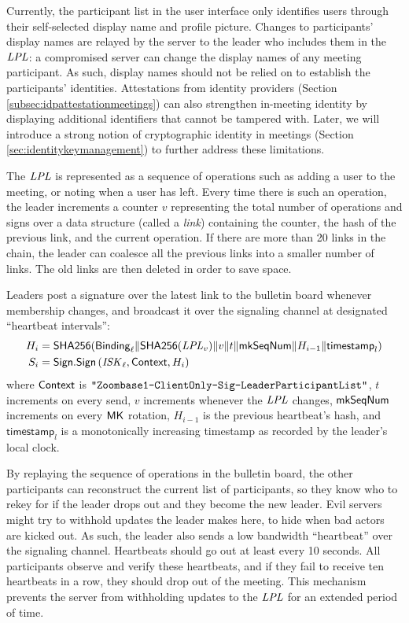 Currently, the participant list in the user interface only identifies users through their
self-selected display name and profile picture. Changes to participants' display names are relayed
by the server to the leader who includes them in the $\mathit{LPL}$: a compromised server can change the
display names of any meeting participant. As such, display names should not be relied on to
establish the participants' identities. Attestations from identity providers (Section
\ref{subsec:idpattestationmeetings}) can also strengthen in-meeting identity by displaying
additional identifiers that cannot be tampered with. Later, we will introduce a strong notion of
cryptographic identity in meetings (Section \ref{sec:identitykeymanagement}) to further address
these limitations.

The $\mathit{LPL}$ is represented as a sequence of operations such as adding a user to the meeting, or
noting when a user has left. Every time there is such an operation, the leader increments a counter
$v$ representing the total number of operations and signs over a data structure (called a
\textit{link}) containing the counter, the hash of the previous link, and the current operation. If
there are more than 20 links in the chain, the leader can coalesce all the previous links into a
smaller number of links. The old links are then deleted in order to save space.

Leaders post a signature over the latest link to the bulletin board whenever membership changes, and
broadcast it over the signaling channel at designated ``heartbeat intervals'':
%
\begin{align*}
    H_i &= \mathsf{SHA256}({\sf Binding}_{\ell} \| \mathsf{SHA256}(\mathit{LPL}_v) \| v \| t \| \mathsf{mkSeqNum} \| H_{i-1} \| \textsf{timestamp}_l  ) \\
    S_i &= {\sf Sign}.\mathsf{Sign} \left(\mathit{ISK}_{\ell}, {\sf Context}, H_i \right)
\end{align*}
%
where ${\sf Context}$ is $\texttt{"Zoombase1-ClientOnly-Sig-Leader\-Participant\-List"}$, $t$ increments
on every send, $v$ increments whenever the $\mathit{LPL}$ changes, $\mathsf{mkSeqNum}$ increments on every
${\sf MK}$ rotation, $H_{i-1}$ is the previous heartbeat's hash, and $\textsf{timestamp}_l$ is a
monotonically increasing timestamp as recorded by the leader's local clock.

By replaying the sequence of operations in the bulletin board, the other participants can
reconstruct the current list of participants, so they know who to rekey for if the leader drops out
and they become the new leader. Evil servers might try to withhold updates the leader makes here, to
hide when bad actors are kicked out. As such, the leader also sends a low bandwidth ``heartbeat''
over the signaling channel. Heartbeats should go out at least every 10 seconds. All participants
observe and verify these heartbeats, and if they fail to receive ten heartbeats in a row, they
should drop out of the meeting. This mechanism prevents the server from withholding updates to the
$\mathit{LPL}$ for an extended period of time.


